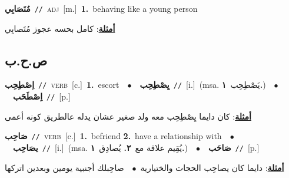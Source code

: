 \documentclass[10pt,a4paper,twoside]{article} %
\begin{document}
\begin{multicols}{2}
{{{{{{{{{\setlength\topsep{0pt}\textbf{\foreignlanguage{arabic}{مُتَصَابِي}}\ {\color{gray}\texttt{//}\color{black}}\ \textsc{adj}\ [m.]\ \textbf{1.}~behaving like a young person\  \begin{flushright}\color{gray}\foreignlanguage{arabic}{\textbf{\underline{\foreignlanguage{arabic}{أمثلة}}}: كامل بحسه عجوز مُتَصابِي}\end{flushright}\color{black}} \vspace{2mm}

\vspace{-3mm}
\subsection*{\color{blue}\foreignlanguage{arabic}{ص.ح.ب}\color{blue}{}} 

{\setlength\topsep{0pt}\textbf{\foreignlanguage{arabic}{اِصْطِحِب}}\ {\color{gray}\texttt{//}\color{black}}\ \textsc{verb}\ [c.]\ \textbf{1.}~escort\ \ $\bullet$\ \ \setlength\topsep{0pt}\textbf{\foreignlanguage{arabic}{يِصْطِحِب}}\ {\color{gray}\texttt{//}\color{black}}\ [i.]\ \color{gray}(msa. \foreignlanguage{arabic}{يَصْطِحِب}~\foreignlanguage{arabic}{\textbf{١.}})\color{black}\ \ $\bullet$\ \ \setlength\topsep{0pt}\textbf{\foreignlanguage{arabic}{اِصْطَحَب}}\ {\color{gray}\texttt{//}\color{black}}\ [p.]\  \begin{flushright}\color{gray}\foreignlanguage{arabic}{\textbf{\underline{\foreignlanguage{arabic}{أمثلة}}}: كان دايما يِصْطِحِب معه ولد صغير عشان يدله عالطريق كونه أعمى}\end{flushright}\color{black}} \vspace{2mm}

{\setlength\topsep{0pt}\textbf{\foreignlanguage{arabic}{صَاحِب}}\ {\color{gray}\texttt{//}\color{black}}\ \textsc{verb}\ [c.]\ \textbf{1.}~befriend  \textbf{2.}~have a relationship with\ \ $\bullet$\ \ \setlength\topsep{0pt}\textbf{\foreignlanguage{arabic}{يصَاحِب}}\ {\color{gray}\texttt{//}\color{black}}\ [i.]\ \color{gray}(msa. \foreignlanguage{arabic}{يُقِيم علاقة مع}~\foreignlanguage{arabic}{\textbf{٢.}}  \foreignlanguage{arabic}{يُصادِق}~\foreignlanguage{arabic}{\textbf{١.}})\color{black}\ \ $\bullet$\ \ \setlength\topsep{0pt}\textbf{\foreignlanguage{arabic}{صَاحَب}}\ {\color{gray}\texttt{//}\color{black}}\ [p.]\  \begin{flushright}\color{gray}\foreignlanguage{arabic}{\textbf{\underline{\foreignlanguage{arabic}{أمثلة}}}: دايما كان يصاحِب الحجات والختيارية\ $\bullet$\ \  صاحِبلك أجنبية يومين وبعدين اتركها}\end{flushright}\color{black}} \vspace{2mm}

}}}}}}}}
\end{multicols}
\end{document}

